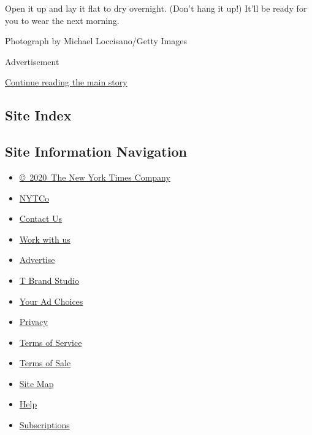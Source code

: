 Open it up and lay it flat to dry overnight. (Don't hang it up!) It'll
be ready for you to wear the next morning.

Photograph by Michael Loccisano/Getty Images

Advertisement

\protect\hyperlink{after-bottom}{Continue reading the main story}

\hypertarget{site-index}{%
\subsection{Site Index}\label{site-index}}

\hypertarget{site-information-navigation}{%
\subsection{Site Information
Navigation}\label{site-information-navigation}}

\begin{itemize}
\tightlist
\item
  \href{https://help.nytimes3xbfgragh.onion/hc/en-us/articles/115014792127-Copyright-notice}{©~2020~The
  New York Times Company}
\end{itemize}

\begin{itemize}
\tightlist
\item
  \href{https://www.nytco.com/}{NYTCo}
\item
  \href{https://help.nytimes3xbfgragh.onion/hc/en-us/articles/115015385887-Contact-Us}{Contact
  Us}
\item
  \href{https://www.nytco.com/careers/}{Work with us}
\item
  \href{https://nytmediakit.com/}{Advertise}
\item
  \href{http://www.tbrandstudio.com/}{T Brand Studio}
\item
  \href{https://www.nytimes3xbfgragh.onion/privacy/cookie-policy\#how-do-i-manage-trackers}{Your
  Ad Choices}
\item
  \href{https://www.nytimes3xbfgragh.onion/privacy}{Privacy}
\item
  \href{https://help.nytimes3xbfgragh.onion/hc/en-us/articles/115014893428-Terms-of-service}{Terms
  of Service}
\item
  \href{https://help.nytimes3xbfgragh.onion/hc/en-us/articles/115014893968-Terms-of-sale}{Terms
  of Sale}
\item
  \href{https://spiderbites.nytimes3xbfgragh.onion}{Site Map}
\item
  \href{https://help.nytimes3xbfgragh.onion/hc/en-us}{Help}
\item
  \href{https://www.nytimes3xbfgragh.onion/subscription?campaignId=37WXW}{Subscriptions}
\end{itemize}
